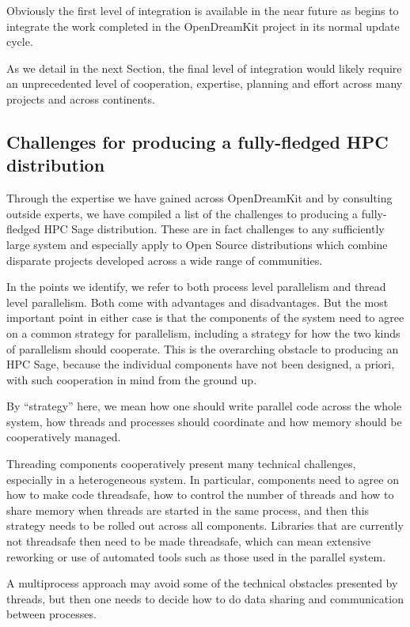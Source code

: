 \documentclass{deliverablereport}
\begin{document}
Obviously the first level of integration is available in the near future as \SageMath
begins to integrate the work completed in the OpenDreamKit project in its normal update
cycle.

As we detail in the next Section, the final level of integration would likely require an unprecedented level of
cooperation, expertise, planning and effort across many projects and across continents.

\subsection{Challenges for producing a fully-fledged HPC \SageMath distribution}

Through the expertise we have gained across OpenDreamKit and by consulting outside
experts, we have compiled a list of the challenges to producing a fully-fledged
HPC Sage distribution. These are in fact challenges to any sufficiently large system
and especially apply to Open Source distributions which combine disparate projects
developed across a wide range of communities.

In the points we identify, we refer to both process level parallelism and thread level
parallelism. Both come with advantages and disadvantages. But the most important point
in either case is that the components of the system need to agree on a common strategy
for parallelism, including a strategy for how the two kinds of parallelism should
cooperate. This is the overarching obstacle to producing an HPC Sage, because the individual
components have not been designed, a priori, with such cooperation in mind from the ground up.

By ``strategy'' here, we mean how one should write parallel code across the whole system, how
threads and processes should coordinate and how memory should be cooperatively managed.

Threading components cooperatively present many technical challenges, especially in a
heterogeneous system. In particular, components need to agree on how to make code threadsafe,
how to control the number of threads and how to share memory when threads are started in the
same process, and then this strategy needs to be rolled out across all components. Libraries
that are currently not threadsafe then need to be made threadsafe, which can mean extensive
reworking or use of automated tools such as those used in the parallel \Singular system.

A multiprocess approach may avoid some of the technical obstacles presented by threads, but
then one needs to decide how to do data sharing and communication between processes.
\end{document}
